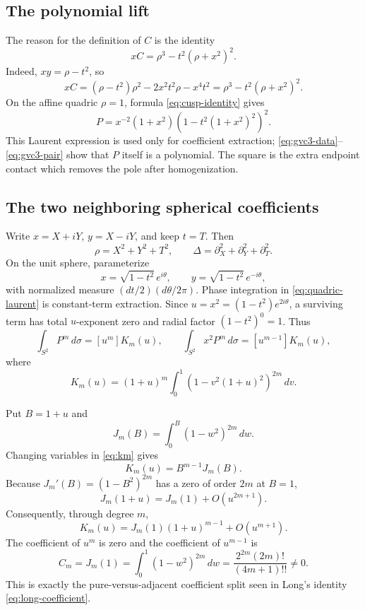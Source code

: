 \documentclass[11pt]{article}
\begin{document}
\subsection{The polynomial lift}

The reason for the definition of $C$ is the identity
\begin{equation}\label{eq:cusp-identity}
 xC=\rho^3-t^2(\rho+x^2)^2.
\end{equation}
Indeed, $xy=\rho-t^2$, so
\[
 xC=(\rho-t^2)\rho^2-2x^2t^2\rho-x^4t^2
    =\rho^3-t^2(\rho+x^2)^2.
\]
On the affine quadric $\rho=1$, formula \eqref{eq:cusp-identity} gives
\begin{equation}\label{eq:quadric-laurent}
 P=x^{-2}(1+x^2)
       \left(1-t^2(1+x^2)^2\right)^2.
\end{equation}
This Laurent expression is used only for coefficient extraction;
\eqref{eq:gvc3-data}--\eqref{eq:gvc3-pair} show that $P$ itself is a
polynomial.  The square is the extra endpoint contact which removes the
pole after homogenization.

\subsection{The two neighboring spherical coefficients}

Write $x=X+iY$, $y=X-iY$, and keep $t=T$.  Then
\[
 \rho=X^2+Y^2+T^2,
 \qquad
 \Delta=\partial_X^2+\partial_Y^2+\partial_T^2.
\]
On the unit sphere, parameterize
\[
 x=\sqrt{1-t^2}\,e^{i\theta},
 \qquad y=\sqrt{1-t^2}\,e^{-i\theta},
\]
with normalized measure $(dt/2)(d\theta/2\pi)$.  Phase integration in
\eqref{eq:quadric-laurent} is constant-term extraction.
Since $u=x^2=(1-t^2)e^{2i\theta}$, a surviving term has total
$u$-exponent zero and radial factor $(1-t^2)^0=1$.  Thus
\begin{equation}\label{eq:sphere-coefficients}
 \int_{S^2}P^m\,d\sigma=[u^m]K_m(u),
 \qquad
 \int_{S^2}x^2P^m\,d\sigma=[u^{m-1}]K_m(u),
\end{equation}
where
\begin{equation}\label{eq:km}
 K_m(u)=(1+u)^m\int_0^1
       \left(1-v^2(1+u)^2\right)^{2m}\,dv.
\end{equation}

Put $B=1+u$ and
\[
 J_m(B)=\int_0^B(1-w^2)^{2m}\,dw.
\]
Changing variables in \eqref{eq:km} gives
\[
 K_m(u)=B^{m-1}J_m(B).
\]
Because $J_m'(B)=(1-B^2)^{2m}$ has a zero of order $2m$ at $B=1$,
\[
 J_m(1+u)=J_m(1)+O(u^{2m+1}).
\]
Consequently, through degree $m$,
\[
 K_m(u)=J_m(1)(1+u)^{m-1}+O(u^{m+1}).
\]
The coefficient of $u^m$ is zero and the coefficient of $u^{m-1}$ is
\begin{equation}\label{eq:cm}
 C_m=J_m(1)=\int_0^1(1-w^2)^{2m}\,dw
 =\frac{2^{2m}(2m)!}{(4m+1)!!}\ne0.
\end{equation}
This is exactly the pure-versus-adjacent coefficient split seen in Long's
identity \eqref{eq:long-coefficient}.
\end{document}
